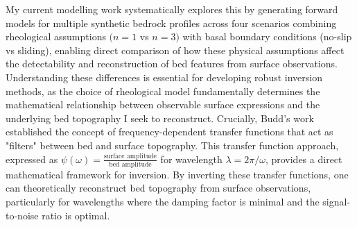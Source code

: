 My current modelling work systematically explores this by generating forward models for multiple synthetic bedrock profiles across four scenarios combining rheological assumptions $(n = 1$ vs $n = 3)$ with basal boundary conditions (no-slip vs sliding), enabling direct comparison of how these physical assumptions affect the detectability and reconstruction of bed features from surface observations. Understanding these differences is essential for developing robust inversion methods, as the choice of rheological model fundamentally determines the mathematical relationship between observable surface expressions and the underlying bed topography I seek to reconstruct.
Crucially, Budd's work established the concept of frequency-dependent transfer functions that act as "filters" between bed and surface topography. This transfer function approach, expressed as $\psi(\omega) = \frac{\text{surface amplitude}}{\text{bed amplitude}}$ for wavelength $\lambda = 2\pi/\omega$, provides a direct mathematical framework for inversion. By inverting these transfer functions, one can theoretically reconstruct bed topography from surface observations, particularly for wavelengths where the damping factor is minimal and the signal-to-noise ratio is optimal.

